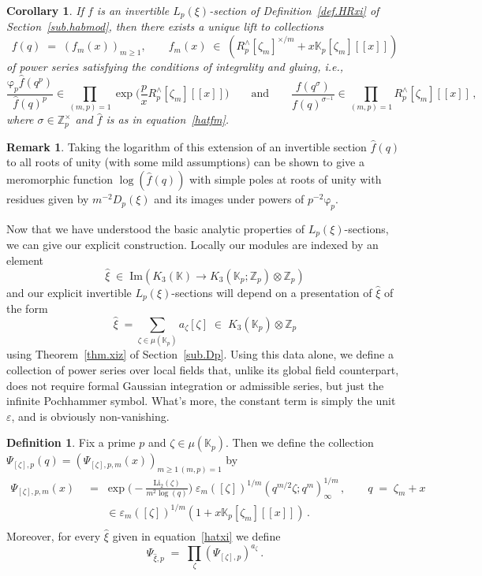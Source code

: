 \documentclass[12pt,reqno]{amsart}
\newtheorem{corollary}[proposition]{Corollary}
\theoremstyle{definition}
\newtheorem{definition}[proposition]{Definition}
\newtheorem{remark}[proposition]{Remark}
\def\BZ{\mathbb Z}
\def\BK{\mathbb K}
\def\ve{\varepsilon}
\def\Li{\mathrm{Li}}
\def\be{\begin{equation}}
\def\ee{\end{equation}}
\def\z{\zeta}
\def\={\;=\;}
\def\inn{\;\in\;}
\def\fr{\mathrm{\varphi}_p}
\begin{document}
\begin{corollary}
\label{cor:unique.loc}
If $f$ is an invertible $L_{p}(\xi)$-section of Definition~\ref{def.HRxi} of
Section~\ref{sub.habmod}, then there exists a unique lift to collections
\be
f(q) \=(f_{m}(x))_{m\geq1}, \qquad
f_{m}(x)\inn
(R^\wedge_p[\z_m]^{\times/m} + x\BK_p[\z_m][\![x]\!])
\ee
of power series satisfying the conditions of integrality and gluing, i.e.,
\be
\frac{\fr \widehat{f}(q^p)}{\widehat{f}(q)^p}
\in\!\!\prod_{(m,p)=1}\exp\Big(\frac{p}{x}R^\wedge_p[\z_m][\![x]\!]\Big)
\qquad\text{and}\qquad
\frac{f(q^{\sigma})}{f(q)^{\sigma^{-1}}}
\in\!\!\prod_{(m,p)=1}R^\wedge_p[\z_m][\![x]\!]\,,
\ee
where $\sigma\in\BZ_{p}^{\times}$ and $\widehat{f}$ is as in equation~\eqref{hatfm}.
\end{corollary}

\begin{remark}
\label{rem:mero}
Taking the logarithm of this extension of an invertible section $\widehat f(q)$
to all roots
of unity (with some mild assumptions) can be shown to give a meromorphic function
$\log(\widehat f(q))$ with simple poles at roots of unity with residues given by
$m^{-2}D_{p}(\xi)$ and its images under powers of $p^{-2}\fr$.
\end{remark}

Now that we have understood the basic analytic properties of $L_p(\xi)$-sections,
we can give our explicit construction.
Locally our modules are indexed by an element
\be
\label{hatxia}
\widehat\xi \inn \mathrm{Im}(K_3(\BK) \to K_3(\BK_p;\BZ_p) \otimes \BZ_p) 
\ee
and our explicit invertible $L_p(\xi)$-sections
will depend on a presentation of $\widehat\xi$ of the form
\be
\label{hatxi}
\widehat\xi\;=\sum_{\z \in \mu(\BK_p)} a_\z [\z] \inn K_3(\BK_p) \otimes \BZ_p
\ee
using Theorem~\ref{thm.xiz} of Section~\ref{sub.Dp}. Using this data alone, we
define a collection of power series over local fields that, unlike its global
field counterpart, does not require formal Gaussian integration or admissible
series, but just the infinite Pochhammer symbol. What's more, the constant term
is simply the unit $\ve$, and is obviously non-vanishing.

\begin{definition}
\label{def.psi}
Fix a prime $p$ and $\z \in \mu(\BK_p)$. Then we define the collection
$\Psi_{[\z],p}(q) = (\Psi_{[\z],p,m}(x))_{m\geq 1\,(m,p)=1}$ 
by
\be
\label{Psiz}
\begin{aligned}
\Psi_{[\z],p,m}(x) 
&\= \exp\Big(-\frac{\Li_2(\z)}{m^2\log(q)}\Big)\;\ve_m([\z])^{1/m}
(q^{m/2}\z;q^m)_\infty^{1/m}\,,\qquad q\=\z_m+x\\
&\qquad\in \ve_m([\z])^{1/m}(1 + x\BK_p[\z_m][\![x]\!])\,. \\
\end{aligned}
\ee
Moreover, for every $\widehat\xi$ given in equation~\eqref{hatxi} we define
\be
\label{Psixi}
\Psi_{\widehat\xi,p} \= \prod_{\z} (\Psi_{[\z],p})^{a_\z}\,.
\ee
\end{definition}
\end{document}
